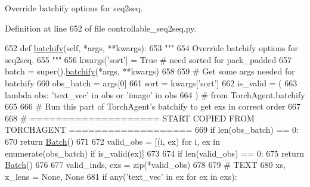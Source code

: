 \begin{DoxyVerb}Override batchify options for seq2seq.
\end{DoxyVerb}
 

Definition at line 652 of file controllable\+\_\+seq2seq.\+py.


\begin{DoxyCode}
652     \textcolor{keyword}{def }\hyperlink{namespaceparlai_1_1agents_1_1drqa_1_1utils_aca22dd97c5b6dcda2a7479c1cb22ef1e}{batchify}(self, *args, **kwargs):
653         \textcolor{stringliteral}{"""}
654 \textcolor{stringliteral}{        Override batchify options for seq2seq.}
655 \textcolor{stringliteral}{        """}
656         kwargs[\textcolor{stringliteral}{'sort'}] = \textcolor{keyword}{True}  \textcolor{comment}{# need sorted for pack\_padded}
657         batch = super().\hyperlink{namespaceparlai_1_1agents_1_1drqa_1_1utils_aca22dd97c5b6dcda2a7479c1cb22ef1e}{batchify}(*args, **kwargs)
658 
659         \textcolor{comment}{# Get some args needed for batchify}
660         obs\_batch = args[0]
661         sort = kwargs[\textcolor{stringliteral}{'sort'}]
662         is\_valid = (
663             \textcolor{keyword}{lambda} obs: \textcolor{stringliteral}{'text\_vec'} \textcolor{keywordflow}{in} obs \textcolor{keywordflow}{or} \textcolor{stringliteral}{'image'} \textcolor{keywordflow}{in} obs
664         )  \textcolor{comment}{# from TorchAgent.batchify}
665 
666         \textcolor{comment}{# Run this part of TorchAgent's batchify to get exs in correct order}
667 
668         \textcolor{comment}{# ==================== START COPIED FROM TORCHAGENT ===================}
669         \textcolor{keywordflow}{if} len(obs\_batch) == 0:
670             \textcolor{keywordflow}{return} \hyperlink{namespaceparlai_1_1agents_1_1legacy__agents_1_1seq2seq_1_1torch__agent__v1_a74cfde390a2b9861179ac0fcd59da28c}{Batch}()
671 
672         valid\_obs = [(i, ex) \textcolor{keywordflow}{for} i, ex \textcolor{keywordflow}{in} enumerate(obs\_batch) \textcolor{keywordflow}{if} is\_valid(ex)]
673 
674         \textcolor{keywordflow}{if} len(valid\_obs) == 0:
675             \textcolor{keywordflow}{return} \hyperlink{namespaceparlai_1_1agents_1_1legacy__agents_1_1seq2seq_1_1torch__agent__v1_a74cfde390a2b9861179ac0fcd59da28c}{Batch}()
676 
677         valid\_inds, exs = zip(*valid\_obs)
678 
679         \textcolor{comment}{# TEXT}
680         xs, x\_lens = \textcolor{keywordtype}{None}, \textcolor{keywordtype}{None}
681         \textcolor{keywordflow}{if} any(\textcolor{stringliteral}{'text\_vec'} \textcolor{keywordflow}{in} ex \textcolor{keywordflow}{for} ex \textcolor{keywordflow}{in} exs):

\end{DoxyCode}
